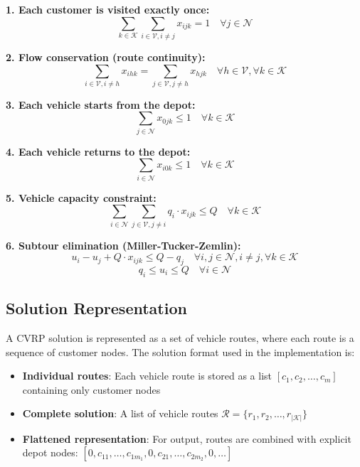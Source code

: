 \documentclass[11pt]{article}
\begin{document}
\textbf{1. Each customer is visited exactly once:}
\begin{equation}
\sum_{k \in \mathcal{K}} \sum_{i \in \mathcal{V}, i \neq j} x_{ijk} = 1 \quad \forall j \in \mathcal{N}
\end{equation}

\textbf{2. Flow conservation (route continuity):}
\begin{equation}
\sum_{i \in \mathcal{V}, i \neq h} x_{ihk} = \sum_{j \in \mathcal{V}, j \neq h} x_{hjk} \quad \forall h \in \mathcal{V}, \forall k \in \mathcal{K}
\end{equation}

\textbf{3. Each vehicle starts from the depot:}
\begin{equation}
\sum_{j \in \mathcal{N}} x_{0jk} \leq 1 \quad \forall k \in \mathcal{K}
\end{equation}

\textbf{4. Each vehicle returns to the depot:}
\begin{equation}
\sum_{i \in \mathcal{N}} x_{i0k} \leq 1 \quad \forall k \in \mathcal{K}
\end{equation}

\textbf{5. Vehicle capacity constraint:}
\begin{equation}
\sum_{i \in \mathcal{N}} \sum_{j \in \mathcal{V}, j \neq i} q_i \cdot x_{ijk} \leq Q \quad \forall k \in \mathcal{K}
\end{equation}

\textbf{6. Subtour elimination (Miller-Tucker-Zemlin):}
\begin{equation}
u_i - u_j + Q \cdot x_{ijk} \leq Q - q_j \quad \forall i, j \in \mathcal{N}, i \neq j, \forall k \in \mathcal{K}
\end{equation}
\begin{equation}
q_i \leq u_i \leq Q \quad \forall i \in \mathcal{N}
\end{equation}

\subsection{Solution Representation}

A CVRP solution is represented as a set of vehicle routes, where each route is a sequence of customer nodes. The solution format used in the implementation is:

\begin{itemize}
    \item \textbf{Individual routes}: Each vehicle route is stored as a list $[c_1, c_2, \ldots, c_m]$ containing only customer nodes
    \item \textbf{Complete solution}: A list of vehicle routes $\mathcal{R} = \{r_1, r_2, \ldots, r_{|\mathcal{K}|}\}$
    \item \textbf{Flattened representation}: For output, routes are combined with explicit depot nodes: $[0, c_{11}, \ldots, c_{1m_1}, 0, c_{21}, \ldots, c_{2m_2}, 0, \ldots]$
\end{itemize}
\end{document}
